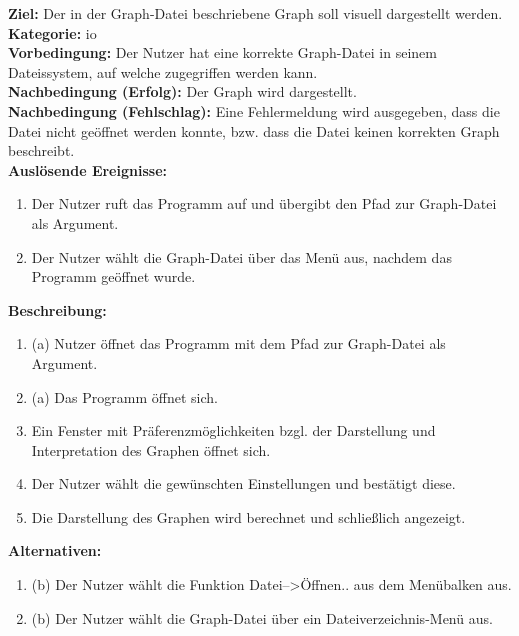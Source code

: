 \label{fa:laden}
\textbf{Ziel:} Der in der Graph-Datei beschriebene Graph soll visuell dargestellt werden. \\
\textbf{Kategorie:} \gls{io} \\
\textbf{Vorbedingung:} Der Nutzer hat eine korrekte Graph-Datei in seinem Dateissystem, auf welche zugegriffen werden kann. \\ %
\textbf{Nachbedingung (Erfolg):} Der Graph wird dargestellt. \\
\textbf{Nachbedingung (Fehlschlag):}
Eine Fehlermeldung wird ausgegeben, dass die Datei nicht geöffnet werden konnte, bzw. dass die Datei keinen korrekten Graph beschreibt. \\
\textbf{Auslösende Ereignisse:}
\begin{enumerate}[nolistsep, label=(\alph*)]
  \item Der Nutzer ruft das Programm auf und übergibt den Pfad zur Graph-Datei als Argument.
  \item Der Nutzer wählt die Graph-Datei über das Menü aus, nachdem das Programm geöffnet wurde.
\end{enumerate}
\textbf{Beschreibung:}
\begin{enumerate}[nolistsep]
  \item (a) Nutzer öffnet das Programm mit dem Pfad zur Graph-Datei als Argument.
  \item (a) Das Programm öffnet sich.
  \item Ein Fenster mit Präferenzmöglichkeiten bzgl. der Darstellung und Interpretation des Graphen öffnet sich.
  \item Der Nutzer wählt die gewünschten Einstellungen und bestätigt diese.
  \item Die Darstellung des Graphen wird berechnet und schließlich angezeigt.
\end{enumerate}
\textbf{Alternativen:}
\begin{enumerate}[nolistsep]
  \item (b) Der Nutzer wählt die Funktion Datei-->Öffnen.. aus dem Menübalken aus. %
  \item (b) Der Nutzer wählt die Graph-Datei über ein Dateiverzeichnis-Menü aus.%
\end{enumerate}


